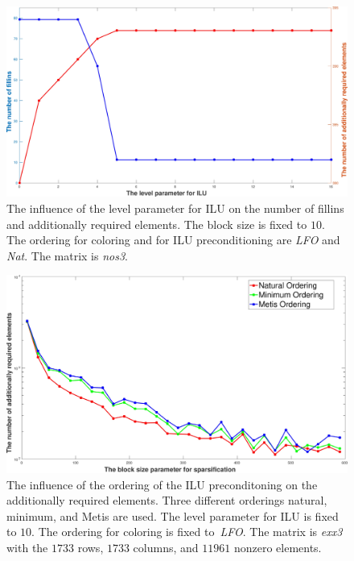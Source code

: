 \documentclass[12pt, oneside]{book}
\begin{document}
\begin{figure}
\centering
\includegraphics[width=0.9\linewidth]{el_fillins.jpg}
\caption{The influence of the level parameter for ILU on the number of fillins and
additionally required elements. The block size is fixed to $10$. The ordering for coloring
and for ILU preconditioning are \textit{LFO} and \textit{Nat}. The matrix is \textit{nos3}.}
\label{el_fillins}
\end{figure}

\begin{figure}
\centering
\includegraphics[width=0.9\linewidth]{add_blocksize.jpg}
\caption{The influence of the ordering of the ILU preconditoning 
on the additionally required elements. 
Three different orderings natural, minimum, and Metis are used.
The level parameter for ILU is fixed to $10$. 
The ordering for coloring is fixed to~\textit{LFO}.
The matrix is \textit{exx3} with the $1733$ rows,
$1733$ columns, and $11961$ nonzero elements.}
\label{add_blocksize}
\end{figure}
\end{document}
